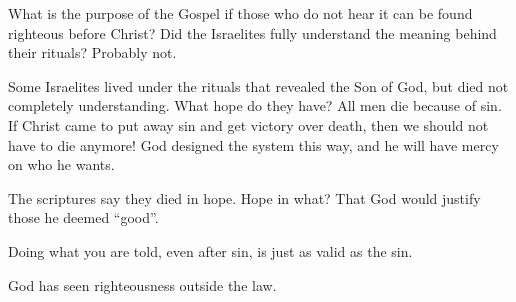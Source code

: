 \documentclass[12pt]{article}
\begin{document}
	What is the purpose of the Gospel if those who do not hear
	it can be found righteous before Christ? Did the Israelites
	fully understand the meaning behind their rituals? Probably not.

	\begin{quote}
		\BibleHebrewsNineTwentyTwo{}
		\BibleHebrewsNineTwentyThree{}
		\BibleHebrewsNineTwentyFour{}
		\BibleHebrewsNineTwentyFive{}
		\BibleHebrewsNineTwentySix{}
		\BibleHebrewsNineTwentySeven{}
		\BibleHebrewsNineTwentyEight{}
	\end{quote}

	Some Israelites lived under the rituals that revealed the Son
	of God, but died not completely understanding. What hope do they
	have? All men die because of sin. If Christ came to put away sin
	and get victory over death, then we should not have to die anymore!
	God designed the system this way, and he will have mercy on who
	he wants.

	\begin{quote}
		\BibleGenesisSixEight{}
	\end{quote}

	\begin{quote}
		\BibleExodusThirtyThreeNineteen{}
	\end{quote}

	The scriptures say they died in hope. Hope in what? That God
	would justify those he deemed ``good''.

	Doing what you are told, even after sin, is just as valid as
	the sin. 

	God has seen righteousness outside the law.

	\begin{quote}
		\BibleGalatiansFiveThirteen{}
		\BibleGalatiansFiveFourteen{}
	\end{quote}

	\begin{quote}
		\BibleIsaiahTwentyEightFourteen{}
		\BibleIsaiahTwentyEightFifteen{}
		\BibleIsaiahTwentyEightSixteen{}
	\end{quote}
\end{document}
